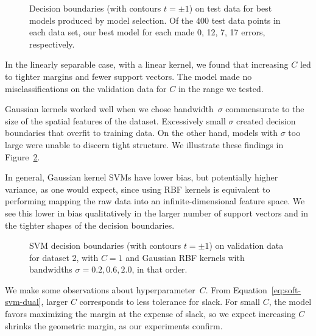 \documentclass{article}
\begin{document}
\begin{multicols}{2}
\begin{figure}[h]
      \centering
   \caption{Decision boundaries (with contours $t = \pm1$)
   on test data for best models produced by model selection.
   Of the 400 test data points in each data set,
   our best model for each made 0, 12, 7, 17 errors, respectively.}
   \label{fig:2-3-gaussian-rbf}
\end{figure}

In the linearly separable case, with a linear kernel,
we found that increasing $C$ led to tighter margins and fewer support vectors.
The model made no misclassifications on the validation data for $C$ in the range we tested.

Gaussian kernels worked well when we chose bandwidth~$\sigma$
commensurate to the size of the spatial features of the dataset.
Excessively small $\sigma$ created decision boundaries that overfit to training data.
On the other hand, models with $\sigma$ too large were unable to discern tight structure.
We illustrate these findings in Figure~\ref{fig:2-3-gaussian-rbf}.

In general,
Gaussian kernel SVMs have lower bias,
but potentially higher variance,
as one would expect, since using RBF kernels is equivalent to
performing mapping the raw data into an infinite-dimensional feature space.
We see this lower in bias qualitatively
in the larger number of support vectors
and in the tighter shapes of the decision boundaries.

\begin{figure}[h]
   \centering
   \caption{SVM decision boundaries (with contours $t = \pm1$) on validation data for dataset 2, with $C = 1$ and Gaussian RBF kernels with bandwidths $\sigma=0.2,0.6,2.0$, in that order.}
   \label{fig:2-3-gaussian-rbf}
\end{figure}

We make some observations about hyperparameter~$C$.
From Equation~\ref{eq:soft-svm-dual},
larger $C$ corresponds to less tolerance for slack.
For small $C$, the model favors
maximizing the margin at the expense of slack,
so we expect increasing $C$ shrinks the geometric margin,
as our experiments confirm.


\end{multicols}
\end{document}
